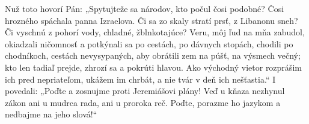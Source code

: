 Nuž toto hovorí Pán:
„Spytujteže sa národov,
kto počul čosi podobné?
Čosi hrozného spáchala
panna Izraelova.
Či sa zo skaly stratí prsť,
z Libanonu sneh?
Či vyschnú z pohorí vody,
chladné, žblnkotajúce?
Veru, môj ľud na mňa zabudol,
okiadzali ničomnosť
a potkýnali sa po cestách,
po dávnych stopách,
chodili po chodníkoch,
cestách nevysypaných,
aby obrátili zem na púšť,
na výsmech večný;
kto len tadiaľ prejde,
zhrozí sa a pokrúti hlavou.
Ako východný vietor
rozprášim ich pred nepriateľom,
ukážem im chrbát, a nie tvár
v deň ich nešťastia.“
I povedali: „Poďte a zosnujme
proti Jeremiášovi plány!
Veď u kňaza nezhynul zákon
ani u mudrca rada,
ani u proroka reč.
Poďte, porazme ho jazykom
a nedbajme na jeho slová!“